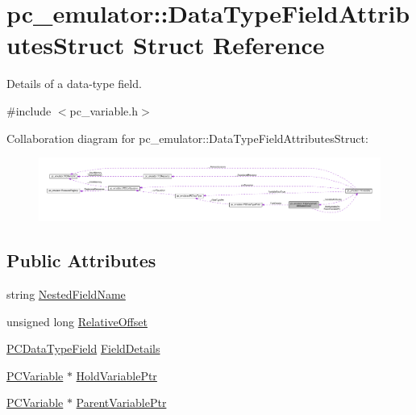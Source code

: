 \hypertarget{structpc__emulator_1_1DataTypeFieldAttributesStruct}{}\section{pc\+\_\+emulator\+:\+:Data\+Type\+Field\+Attributes\+Struct Struct Reference}
\label{structpc__emulator_1_1DataTypeFieldAttributesStruct}


Details of a data-\/type field.  




{\ttfamily \#include $<$pc\+\_\+variable.\+h$>$}



Collaboration diagram for pc\+\_\+emulator\+:\+:Data\+Type\+Field\+Attributes\+Struct\+:\nopagebreak
\begin{figure}[H]
\begin{center}
\leavevmode
\includegraphics[width=350pt]{structpc__emulator_1_1DataTypeFieldAttributesStruct__coll__graph}
\end{center}
\end{figure}
\subsection*{Public Attributes}
\begin{DoxyCompactItemize}
\item 
string \hyperlink{structpc__emulator_1_1DataTypeFieldAttributesStruct_a38b068714c3b4e3bb59cb5406fbb93f2}{Nested\+Field\+Name}
\item 
unsigned long \hyperlink{structpc__emulator_1_1DataTypeFieldAttributesStruct_a9690def189b94d7515ae0ef00f3470ff}{Relative\+Offset}
\item 
\hyperlink{classpc__emulator_1_1PCDataTypeField}{P\+C\+Data\+Type\+Field} \hyperlink{structpc__emulator_1_1DataTypeFieldAttributesStruct_af464d3e0536e9a2a2e5ad6dfc0e91b1c}{Field\+Details}
\item 
\hyperlink{classpc__emulator_1_1PCVariable}{P\+C\+Variable} $\ast$ \hyperlink{structpc__emulator_1_1DataTypeFieldAttributesStruct_a704592013b2e84005a2f8c0a79e36efe}{Hold\+Variable\+Ptr}
\item 
\hyperlink{classpc__emulator_1_1PCVariable}{P\+C\+Variable} $\ast$ \hyperlink{structpc__emulator_1_1DataTypeFieldAttributesStruct_a8ef95a5a44edd724fc88884d969ee65e}{Parent\+Variable\+Ptr}
\end{DoxyCompactItemize}


